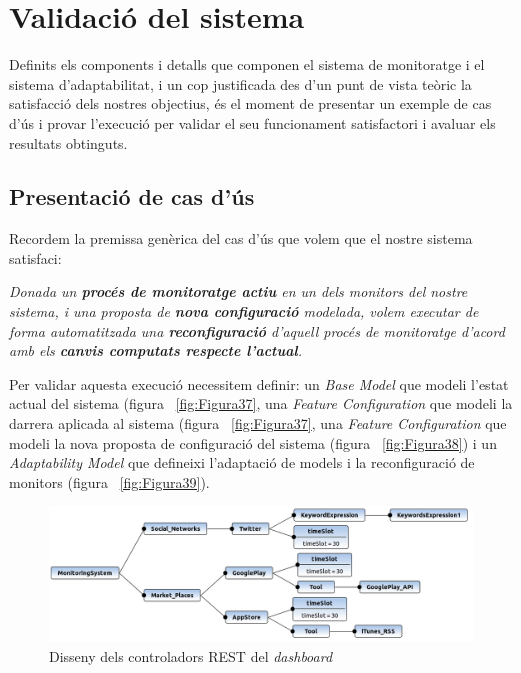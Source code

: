 
\chapter{Validació del sistema} %

Definits els components i detalls que componen el sistema de monitoratge i el sistema d'adaptabilitat, i un cop justificada des d'un punt de vista teòric la satisfacció dels nostres objectius, és el moment de presentar un exemple de cas d'ús i provar l'execució per validar el seu funcionament satisfactori i avaluar els resultats obtinguts.

\section{Presentació de cas d'ús}

Recordem la premissa genèrica del cas d'ús que volem que el nostre sistema satisfaci:

\begin{center}
\textit{Donada un \textbf{procés de monitoratge actiu} en un dels monitors del nostre sistema, i una proposta de \textbf{nova configuració} modelada, volem executar de forma automatitzada una \textbf{reconfiguració} d'aquell procés de monitoratge d'acord amb els \textbf{canvis computats respecte l'actual}.}
\end{center}

Per validar aquesta execució necessitem definir: un \textit{Base Model} que modeli l'estat actual del sistema (figura ~\ref{fig:Figura37}, una \textit{Feature Configuration} que modeli la darrera aplicada al sistema (figura ~\ref{fig:Figura37}, una \textit{Feature Configuration} que modeli la nova proposta de configuració del sistema (figura ~\ref{fig:Figura38}) i un \textit{Adaptability Model} que defineixi l'adaptació de models i la reconfiguració  de monitors (figura ~\ref{fig:Figura39}).

\begin{figure}
\centering
\includegraphics[width=14cm]{Figures/Figure36}
\decoRule
\caption{Disseny dels controladors REST del \textit{dashboard}}
\label{fig:Figura36}
\end{figure} 

